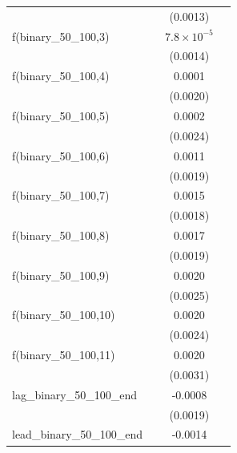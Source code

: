 \begin{tabular}{lccc}
                                    &          & (0.0013)              &   \\   
   f(binary\_50\_100,3)             &          & $7.8\times 10^{-5}$   &   \\   
                                    &          & (0.0014)              &   \\   
   f(binary\_50\_100,4)             &          & 0.0001                &   \\   
                                    &          & (0.0020)              &   \\   
   f(binary\_50\_100,5)             &          & 0.0002                &   \\   
                                    &          & (0.0024)              &   \\   
   f(binary\_50\_100,6)             &          & 0.0011                &   \\   
                                    &          & (0.0019)              &   \\   
   f(binary\_50\_100,7)             &          & 0.0015                &   \\   
                                    &          & (0.0018)              &   \\   
   f(binary\_50\_100,8)             &          & 0.0017                &   \\   
                                    &          & (0.0019)              &   \\   
   f(binary\_50\_100,9)             &          & 0.0020                &   \\   
                                    &          & (0.0025)              &   \\   
   f(binary\_50\_100,10)            &          & 0.0020                &   \\   
                                    &          & (0.0024)              &   \\   
   f(binary\_50\_100,11)            &          & 0.0020                &   \\   
                                    &          & (0.0031)              &   \\   
   lag\_binary\_50\_100\_end        &          & -0.0008               &   \\   
                                    &          & (0.0019)              &   \\   
   lead\_binary\_50\_100\_end       &          & -0.0014               &   \\   

\end{tabular}
